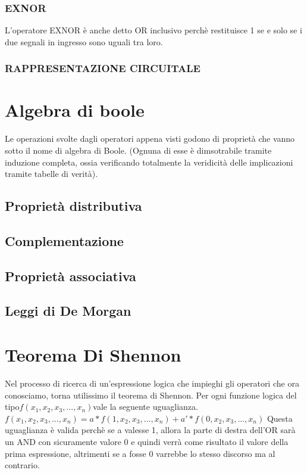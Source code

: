 \documentclass{book}
\begin{document}
\subsubsection*{EXNOR}
L'operatore EXNOR è anche detto OR inclusivo perchè restituisce 1 se e solo se i due segnali in ingresso sono uguali tra loro.
\subsubsection{RAPPRESENTAZIONE CIRCUITALE}
\newpage
\section{Algebra di boole}
Le operazioni svolte dagli operatori appena visti godono di proprietà che vanno sotto il nome di algebra di Boole. (Ognuna di esse è dimsotrabile tramite induzione completa, ossia verificando totalmente la veridicità delle implicazioni tramite tabelle di verità).
\subsection*{Proprietà distributiva}
\subsection*{Complementazione}
\subsection*{Proprietà associativa}
\subsection*{Leggi di De Morgan}
\newpage
\section{Teorema Di Shennon}
Nel processo di ricerca di un'espressione logica che impieghi gli operatori che ora conosciamo, torna utilissimo il teorema di Shennon.
Per ogni funzione logica del tipo\break\newline \( f({x_1},{x_2},{x_3},...,{x_n}) \)\break\newline vale la seguente uguaglianza.\newline \(f({x_1},{x_2},{x_3},...,{x_n})=a*f(1,{x_2},{x_3},...,{x_n})+a'*f(0,{x_2},{x_3},...,{x_n})\)\break\newline
Questa uguaglianza è valida perchè se a valesse 1, allora la parte di destra dell'OR sarà un AND con sicuramente valore 0 e quindi verrà come risultato il valore della prima espressione, altrimenti se a fosse 0 varrebbe lo stesso discorso ma al contrario.
\end{document}
